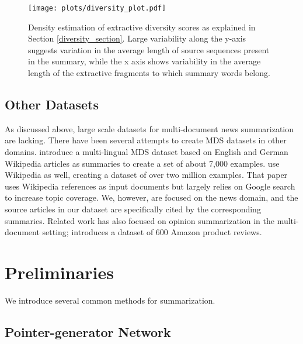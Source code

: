 \documentclass[11pt,a4paper]{article}
\begin{document}
    


\begin{figure}[t]
    \centering
    \texttt{[image: plots/diversity\_plot.pdf]}
    \caption{ Density estimation of extractive diversity scores as explained in Section \ref{diversity_section}. Large variability along the y-axis suggests variation in the average length of source sequences present in the summary, while the x axis shows variability in the average length of the extractive fragments to which summary words belong.
    }
    \label{fig:diversity}
    \vspace{-4mm}
\end{figure} 















\subsection{Other Datasets}
As discussed above, large scale datasets for multi-document news summarization are lacking. There have been several attempts to create MDS datasets in other domains.  introduce a multi-lingual MDS dataset based on English and German Wikipedia articles as summaries to create a set of about 7,000 examples.  use Wikipedia as well, creating a dataset of over two million examples. That paper uses Wikipedia references as input documents but largely relies on Google search to increase topic coverage. We, however, are focused on the news domain, and the source articles in our dataset are specifically cited by the corresponding summaries. Related work has also focused on opinion summarization in the multi-document setting;  introduces a dataset of 600 Amazon product reviews.

\section{Preliminaries}
We introduce several common methods for summarization. 
\subsection{Pointer-generator Network}
\end{document}
